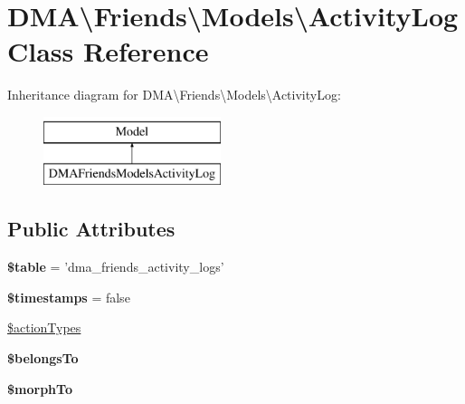 \hypertarget{classDMA_1_1Friends_1_1Models_1_1ActivityLog}{\section{D\+M\+A\textbackslash{}Friends\textbackslash{}Models\textbackslash{}Activity\+Log Class Reference}
\label{classDMA_1_1Friends_1_1Models_1_1ActivityLog}
}
Inheritance diagram for D\+M\+A\textbackslash{}Friends\textbackslash{}Models\textbackslash{}Activity\+Log\+:\begin{figure}[H]
\begin{center}
\leavevmode
\includegraphics[height=2.000000cm]{d8/ddf/classDMA_1_1Friends_1_1Models_1_1ActivityLog}
\end{center}
\end{figure}
\subsection*{Public Attributes}
\begin{DoxyCompactItemize}
\item 
\hypertarget{classDMA_1_1Friends_1_1Models_1_1ActivityLog_a231d21bb93f9c0079c3f5cf51369d0c1}{{\bfseries \$table} = 'dma\+\_\+friends\+\_\+activity\+\_\+logs'}\label{classDMA_1_1Friends_1_1Models_1_1ActivityLog_a231d21bb93f9c0079c3f5cf51369d0c1}

\item 
\hypertarget{classDMA_1_1Friends_1_1Models_1_1ActivityLog_a11055e835c6bf48f58e019267dd469a2}{{\bfseries \$timestamps} = false}\label{classDMA_1_1Friends_1_1Models_1_1ActivityLog_a11055e835c6bf48f58e019267dd469a2}

\item 
\hyperlink{classDMA_1_1Friends_1_1Models_1_1ActivityLog_aa60b5fe0e1e7c254827bfa35c69aef9d}{\$action\+Types}
\item 
{\bfseries \$belongs\+To}
\item 
{\bfseries \$morph\+To}
\end{DoxyCompactItemize}
